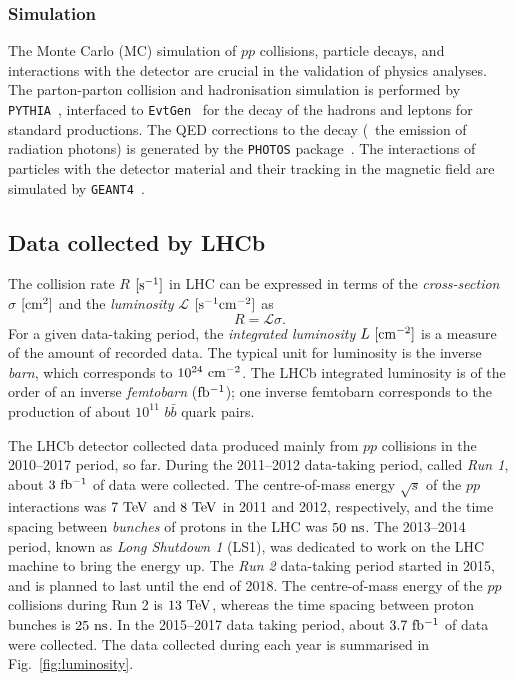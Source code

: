 \subsubsection*{Simulation}
The Monte Carlo (MC) simulation of $pp$ collisions, particle decays, and interactions with the detector are crucial in the validation of physics analyses.
The parton-parton collision and hadronisation simulation is performed by \texttt{PYTHIA}~\cite{Sjostrand:2007gs}, interfaced to \texttt{EvtGen}~\cite{Lange:2001uf} for the decay of the hadrons and leptons for standard productions. The QED corrections to the decay (\ie~the emission of radiation photons) is generated by the \texttt{PHOTOS} package~\cite{Golonka:2005pn}. The interactions of particles with the detector material and their tracking in the magnetic field are simulated by \texttt{GEANT4}~\cite{Agostinelli:2002hh,Allison:2006ve}.

\subsection{Data collected by LHCb}
\label{sec:lhcdata}

The collision rate $R$ $[\rm s^{-1}]$ in LHC can be expressed in terms of the \emph{cross-section} $\sigma$ $[\rm cm^2]$ and the \emph{luminosity} $\mathcal L$ $[\rm s^{-1} \rm cm^{-2}]$ as
\begin{equation}
	R = \mathcal L \sigma.
\end{equation}
For a given data-taking period, the \emph{integrated luminosity} $L~[\rm cm^{-2}]$ is a measure of the amount of recorded data. The typical unit for luminosity is the inverse \emph{barn}, which corresponds to $10^{24}~\rm cm^{-2}$. The LHCb integrated luminosity is of the order of an inverse \emph{femtobarn} ($\rm fb^{-1}$); one inverse femtobarn corresponds to the production of about $10^{11}$ $b\bar b$ quark pairs. 

The LHCb detector collected data produced mainly from $pp$ collisions in the 2010--2017 period, so far. During the 2011--2012 data-taking period, called \emph{Run 1}, about $3\rm~fb^{-1}$ of data were collected. The centre-of-mass energy $\sqrt{s}$ of the $pp$ interactions was $7~\rm TeV$ and $8~\rm TeV$ in 2011 and 2012, respectively, and the time spacing between \emph{bunches} of protons in the LHC was $50~\rm ns$.
The 2013--2014 period, known as \emph{Long Shutdown 1} (LS1), was dedicated to work on the LHC machine to bring the energy up.
The \emph{Run 2} data-taking period started in 2015, and is planned to last until the end of 2018. The centre-of-mass energy of the $pp$ collisions during Run 2 is $13~\rm TeV$, whereas the time spacing between proton bunches is $25~\rm ns$. In the 2015--2017 data taking period, about $3.7~\rm fb^{-1}$ of data were collected. The data collected during each year is summarised in Fig.~\ref{fig:luminosity}.

